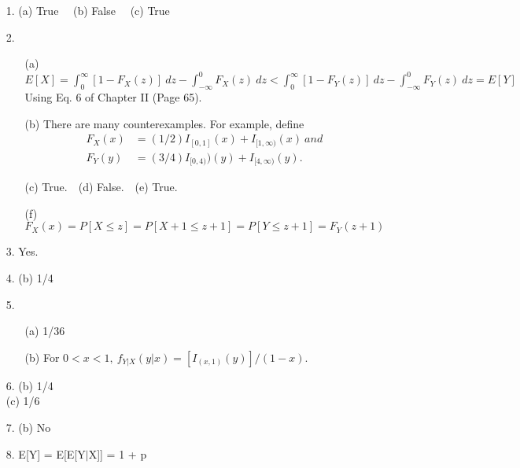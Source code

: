 \begin{enumerate}
	\item[1.] (a) True $\quad$(b) False $\quad$(c) True 
	
	\item[2.] \begin{enumerate}
		
		\item[(a)] $\displaystyle E[X]=\int_0^\infty [1-F_X(z)]\ dz - \int_{-\infty}^0 F_X(z)\ dz < \int_0^\infty [1-F_Y(z)]\ dz - \int_{-\infty}^0 F_Y(z)\ dz = E[Y]$ \\ 
		Using Eq. 6 of Chapter II (Page 65).
		
		\item[(b)] There are many counterexamples.  For example, define  
		\begin{align*} F_X(x) &= (1/2)I_{[0,1]}(x) + I_{[1,\infty)}(x)\ and \\ 
		F_Y(y) &= (3/4)I_{[0,4)})(y) + I_{[4,\infty)}(y).
		\end{align*} 
		
		\item[(c)] True.$\quad$(d) False.$\quad$(e) True.
		
		\item[(f)] $F_X(x) = P[X\le z] = P[X+1\le z+1] = P[Y\le z+1] = F_Y(z+1)$
	\end{enumerate}
	
	\item[3.] Yes.
	
	\item[4.] (b) 1/4
	
	\item[5.] \begin{enumerate}
		
		\item[(a)] 1/36
		
		\item[(b)] For $0< x< 1,\ f_{Y\vert X}(y\vert x) = [I_{(x,1)}(y)]/(1-x).$

		\end{enumerate} 
	
	\item[6.] (b) 1/4 \\
	(c) 1/6
	
	\item[7.] (b) No
	
	\item[8.] E[Y] = E[E[Y$\vert$X]] = 1 + p
	

\end{enumerate}

